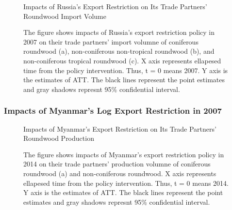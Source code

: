 \documentclass[a4paper,12pt]{article}
\begin{document}
\begin{figure}[H] 
    \centering
    \caption{Impacts of Russia's Export Restriction on Its Trade Partners' Roundwood Import Volume}
    \caption*{\small{The figure shows impacts of Russia's export restriction policy in 2007 on their trade partners' import volumne of coniferous roundwood (a), non-coniferous non-tropical roundwood (b), and non-coniferous tropical roundwood (c). X axis represents ellapesed time from the policy intervention. Thus, t = 0 means 2007. Y axis is the estimates of ATT. The black lines represent the point estimates and gray shadows represnt 95\% confidential interval.}}
    \label{fig:cf_imp_Russia}
\end{figure}

\subsubsection*{Impacts of Myanmar's Log Export Restriction in 2007}

\begin{figure}[H] 
    \centering
    \caption{Impacts of Myanmar's Export Restriction on Its Trade Partners' Roundwood Production}
    \caption*{\small{The figure shows impacts of Myanmar's export restriction policy in 2014 on their trade partners' production volumne of coniferous roundwood (a) and non-coniferous roundwood. X axis represents ellapesed time from the policy intervention. Thus, t = 0 means 2014. Y axis is the estimates of ATT. The black lines represent the point estimates and gray shadows represnt 95\% confidential interval.}}
    \label{fig:att_prod_Myanmar}
\end{figure}
\end{document}
